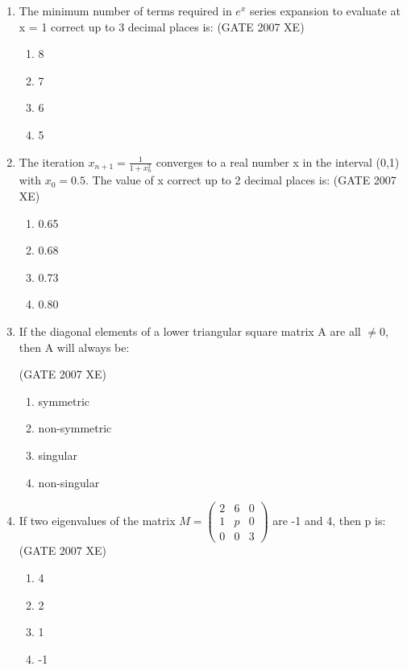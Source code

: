 \documentclass[journal,cmex10]{IEEEtran}
\theoremstyle{remark}
\newcommand{\myvec}[1]{\ensuremath{\begin{pmatrix}#1\end{pmatrix}}}
\numberwithin{equation}{enumi}
\numberwithin{figure}{enumi}
\begin{document}
\begin{enumerate}[label=\arabic*)]
    \item The minimum number of terms required in $e^x$ series expansion to evaluate at x = 1 correct up to 3 decimal places is:
    \hfill{(GATE 2007 XE)}
    \begin{multicols}{4}
    \begin{enumerate}
        \item 8
        \item 7
        \item 6
        \item 5
    \end{enumerate}
\end{multicols}

    \item The iteration $x_{n+1} = \frac{1}{1+x_n^2}$ converges to a real number x in the interval (0,1) with $x_0 = 0.5$. The value of x correct up to 2 decimal places is:
    \hfill{(GATE 2007 XE)}
    \begin{multicols}{4}
    \begin{enumerate}
        \item 0.65
        \item 0.68
        \item 0.73
        \item 0.80
    \end{enumerate}
    \end{multicols}

    \item If the diagonal elements of a lower triangular square matrix A are all $\neq 0$, then A will always be:

    \hfill{(GATE 2007 XE)}
    \begin{multicols}{4}
    \begin{enumerate}
        \item symmetric
        \item non-symmetric
        \item singular
        \item non-singular
    \end{enumerate}
\end{multicols}

    \item If two eigenvalues of the matrix $M = \myvec{2 & 6 & 0 \\ 1 & p & 0 \\ 0 & 0 & 3}$ are -1 and 4, then p is:\\
    \hfill{(GATE 2007 XE)}
    \begin{multicols}{4}
    \begin{enumerate}
        \item 4
        \item 2
        \item 1
        \item -1
    \end{enumerate}
\end{multicols}


\end{enumerate}
\end{document}
